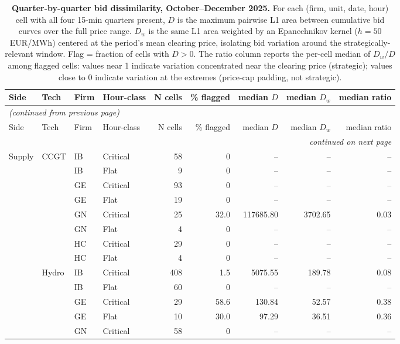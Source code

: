 \small
\begin{longtable}{@{}l l l l r r r r r@{}}
\caption{\textbf{Quarter-by-quarter bid dissimilarity, October--December 2025.} For each (firm, unit, date, hour) cell with all four 15-min quarters present, $D$ is the maximum pairwise L1 area between cumulative bid curves over the full price range. $D_w$ is the same L1 area weighted by an Epanechnikov kernel ($h = 50$ EUR/MWh) centered at the period's mean clearing price, isolating bid variation around the strategically-relevant window. Flag = fraction of cells with $D > 0$. The ratio column reports the per-cell median of $D_w/D$ among flagged cells: values near 1 indicate variation concentrated near the clearing price (strategic); values close to 0 indicate variation at the extremes (price-cap padding, not strategic).}\label{tab:quarter_dissim}\\
\toprule
Side & Tech & Firm & Hour-class & N cells & \% flagged & median $D$ & median $D_w$ & median ratio \\
\midrule
\endfirsthead
\multicolumn{9}{l}{\emph{(continued from previous page)}} \\
\toprule
Side & Tech & Firm & Hour-class & N cells & \% flagged & median $D$ & median $D_w$ & median ratio \\
\midrule
\endhead
\midrule
\multicolumn{9}{r}{\emph{continued on next page}} \\
\endfoot
\bottomrule
\endlastfoot
Supply & CCGT & IB & Critical & 58 & 0 & -- & -- & -- \\
 &  & IB & Flat & 9 & 0 & -- & -- & -- \\
 &  & GE & Critical & 93 & 0 & -- & -- & -- \\
 &  & GE & Flat & 19 & 0 & -- & -- & -- \\
 &  & GN & Critical & 25 & 32.0 & 117685.80 & 3702.65 & 0.03 \\
 &  & GN & Flat & 4 & 0 & -- & -- & -- \\
 &  & HC & Critical & 29 & 0 & -- & -- & -- \\
 &  & HC & Flat & 4 & 0 & -- & -- & -- \\
\addlinespace
 & Hydro & IB & Critical & 408 & 1.5 & 5075.55 & 189.78 & 0.08 \\
 &  & IB & Flat & 60 & 0 & -- & -- & -- \\
 &  & GE & Critical & 29 & 58.6 & 130.84 & 52.57 & 0.38 \\
 &  & GE & Flat & 10 & 30.0 & 97.29 & 36.51 & 0.36 \\
 &  & GN & Critical & 58 & 0 & -- & -- & -- \\

\end{longtable}
